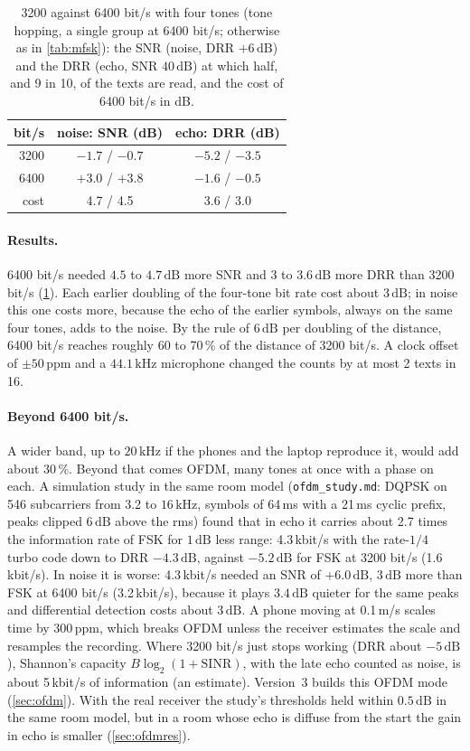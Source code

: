 \documentclass[11pt,a4paper]{article}
\newcommand{\kHz}{\,\mathrm{kHz}}
\newcommand{\dB}{\,\mathrm{dB}}
\newcommand{\code}[1]{\texttt{#1}}
\theoremstyle{remark}
\begin{document}
\begin{table}[ht]
\centering
\caption{3200 against 6400 bit/s with four tones (tone hopping, a single group at 6400 bit/s; otherwise as in \cref{tab:mfsk}): the SNR (noise, DRR $+6\dB$) and the DRR (echo, SNR $40\dB$) at which half, and 9 in 10, of the texts are read, and the cost of 6400 bit/s in dB.}
\label{tab:wide}
\small
\begin{tabular}{rcc}
\toprule
bit/s & noise: SNR (dB) & echo: DRR (dB)\\
\midrule
3200 & $-1.7$ / $-0.7$ & $-5.2$ / $-3.5$\\
6400 & $+3.0$ / $+3.8$ & $-1.6$ / $-0.5$\\
cost & 4.7 / 4.5 & 3.6 / 3.0\\
\bottomrule
\end{tabular}
\end{table}

\paragraph{Results.}
6400 bit/s needed $4.5$ to $4.7\dB$ more SNR and 3 to $3.6\dB$ more DRR than 3200 bit/s (\cref{tab:wide}). Each earlier doubling of the four-tone bit rate cost about $3\dB$; in noise this one costs more, because the echo of the earlier symbols, always on the same four tones, adds to the noise. By the rule of $6\dB$ per doubling of the distance, 6400 bit/s reaches roughly 60 to 70\,\% of the distance of 3200 bit/s. A clock offset of $\pm 50$\,ppm and a $44.1\kHz$ microphone changed the counts by at most 2 texts in 16.

\paragraph{Beyond 6400 bit/s.}
A wider band, up to $20\kHz$ if the phones and the laptop reproduce it, would add about 30\,\%. Beyond that comes OFDM, many tones at once with a phase on each. A simulation study in the same room model (\code{ofdm\_study.md}: DQPSK on 546 subcarriers from 3.2 to $16\kHz$, symbols of 64\,ms with a 21\,ms cyclic prefix, peaks clipped $6\dB$ above the rms) found that in echo it carries about 2.7 times the information rate of FSK for $1\dB$ less range: 4.3\,kbit/s with the rate-$1/4$ turbo code down to DRR $-4.3\dB$, against $-5.2\dB$ for FSK at 3200 bit/s (1.6\,kbit/s). In noise it is worse: 4.3\,kbit/s needed an SNR of $+6.0\dB$, $3\dB$ more than FSK at 6400 bit/s (3.2\,kbit/s), because it plays $3.4\dB$ quieter for the same peaks and differential detection costs about $3\dB$. A phone moving at 0.1\,m/s scales time by 300\,ppm, which breaks OFDM unless the receiver estimates the scale and resamples the recording. Where 3200 bit/s just stops working (DRR about $-5\dB$), Shannon's capacity $B \log_2(1 + \mathrm{SINR})$, with the late echo counted as noise, is about 5\,kbit/s of information (an estimate). Version~3 builds this OFDM mode (\cref{sec:ofdm}). With the real receiver the study's thresholds held within $0.5\dB$ in the same room model, but in a room whose echo is diffuse from the start the gain in echo is smaller (\cref{sec:ofdmres}).
\end{document}
